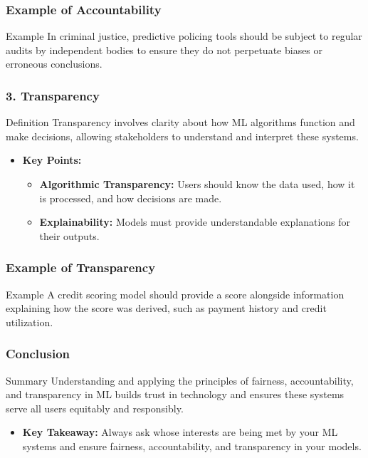 \documentclass[aspectratio=169]{beamer}
\begin{document}
\begin{frame}[fragile]
    \frametitle{Example of Accountability}
    \begin{block}{Example}
        In criminal justice, predictive policing tools should be subject to regular audits by independent bodies to ensure they do not perpetuate biases or erroneous conclusions.
    \end{block}
\end{frame}

\begin{frame}[fragile]
    \frametitle{3. Transparency}
    \begin{block}{Definition}
        Transparency involves clarity about how ML algorithms function and make decisions, allowing stakeholders to understand and interpret these systems.
    \end{block}
    \begin{itemize}
        \item \textbf{Key Points:}
        \begin{itemize}
            \item \textbf{Algorithmic Transparency:} Users should know the data used, how it is processed, and how decisions are made.
            \item \textbf{Explainability:} Models must provide understandable explanations for their outputs.
        \end{itemize}
    \end{itemize}
\end{frame}

\begin{frame}[fragile]
    \frametitle{Example of Transparency}
    \begin{block}{Example}
        A credit scoring model should provide a score alongside information explaining how the score was derived, such as payment history and credit utilization.
    \end{block}
\end{frame}

\begin{frame}[fragile]
    \frametitle{Conclusion}
    \begin{block}{Summary}
        Understanding and applying the principles of fairness, accountability, and transparency in ML builds trust in technology and ensures these systems serve all users equitably and responsibly. 
    \end{block}
    \begin{itemize}
        \item \textbf{Key Takeaway:} Always ask whose interests are being met by your ML systems and ensure fairness, accountability, and transparency in your models.
    \end{itemize}
\end{frame}
\end{document}
